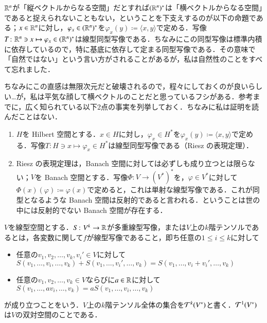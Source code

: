 \begin{que}\label{双対空間は縦ベクトル}
$\mathbb{R}^n$が「縦ベクトルからなる空間」だとすれば$(\mathbb{R}^n)^*$は「横ベクトルからなる空間」であると捉えられないこともない，ということを下支えするのが以下の命題である；$x \in \mathbb{R}^n$に対し，$\varphi_x \in (\mathbb{R}^n)^*$を$\varphi_x(y) \coloneqq \langle x,y \rangle$で定める．写像$T \colon \mathbb{R}^n \ni x \mapsto \varphi_x \in (\mathbb{R}^n)^*$は線型同型写像である．ちなみにこの同型写像は標準内積に依存しているので，特に基底に依存して定まる同型写像である．その意味で「自然ではない」という言い方がされることがあるが，私は自然性のことをすべて忘れました．
\end{que}

\begin{que}[**]
ちなみにこの直感は無限次元だと破壊されるので，程々にしておくのが良いらしい…が，私は平気な顔して横ベクトルのことだと思っているフシがある．参考までに，広く知られている以下2点の事実を列挙しておく．ちなみに私は証明を読んだことはない．
\begin{enumerate}
\item $H$を Hilbert 空間とする．$x \in H$に対し，$\varphi_x \in H^*$を$\varphi_x(y) \coloneqq \langle x,y \rangle$で定める．写像$T \colon H \ni x \mapsto \varphi_x \in H^*$は線型同型写像である（Riesz の表現定理）．
\item Riesz の表現定理は，Banach 空間に対しては必ずしも成り立つとは限らない；$V$を Banach 空間とする．写像$\Phi \colon V \to (V^*)^*$を，$\varphi \in V^*$に対して$\Phi(x)(\varphi) \coloneqq \varphi(x)$で定めると，これは単射な線型写像である．これが同型となるような Banach 空間は反射的であると言われる．ということは世の中には反射的でない Banach 空間が存在する．
\end{enumerate}
\end{que}

\begin{defi}
$V$を線型空間とする．$S \colon V^k \to \mathbb{R}$が多重線型写像，または$V$上の$k$階テンソルであるとは，各変数に関して$f$が線型写像であること，即ち任意の$1 \leq i \leq k$に対して
\begin{itemize}
\item 任意の$v_1, v_2, \dots, v_k, v_i' \in V$に対して$S(v_1, \dots, v_i, \dots, v_k) + S(v_1, \dots, v_i', \dots, v_k) = S(v_1, \dots, v_i + v_i', \dots, v_k)$
\item 任意の$v_1, v_2, \dots, v_k \in V$ならびに$a \in \mathbb{R}$に対して$S(v_1, \dots, av_i, \dots, v_k) = aS(v_1, \dots, v_i, \dots, v_k)$
\end{itemize}が成り立つことをいう．$V$上の$k$階テンソル全体の集合を$\mathcal{T}^k(V^*)$と書く．$\mathcal{T}^1(V^*)$は$V$の双対空間のことである．
\end{defi}

